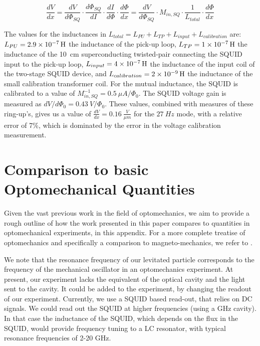 \begin{appendices}
\begin{equation}
    \frac{dV}{dx} = 
    \frac{dV}{d\Phi_{SQ}}\cdot\frac{d\Phi_{SQ}}{dI}\cdot\frac{dI}{d\Phi}\cdot\frac{d\Phi}{dx} =
    \frac{dV}{d\Phi_{SQ}} \cdot M_{in,SQ} \cdot \frac{1}{L_{total}}\cdot \frac{d\Phi}{dx}
\end{equation}

The values for the inductances in $L_{total} = L_{PU}+L_{TP}+L_{input}+L_{calibration}$ are: $L_{PU} = \SI{2.9e{-7}}{H}$ the inductance of the pick-up loop, $L_{TP} = \SI{1e{-7}}{H}$ the inductance of the \SI{10}{cm} superconducting twisted-pair connecting the SQUID input to the pick-up loop, $L_{input} = \SI{4e{-7}}{H}$ the inductance of the input coil of the two-stage SQUID device, and $L_{calibration} = \SI{2e{-9}}{H}$ the inductance of the small calibration transformer coil. For the mutual inductance, the SQUID is calibrated to a value of $M_{in,SQ}^{-1} = \SI{0.5}{\mu A/\Phi_0}$. The SQUID voltage gain is measured as $dV/d\Phi_0 = \SI{0.43}{V/\Phi_0}$. These values, combined with measures of these ring-up's, gives us a value of $\frac{dV}{dx} = \SI{0.16}{{\frac{V}{\mu m}}}$ for the $\SI{27}{Hz}$ mode, with a relative error of 7\%, which is dominated by the error in the voltage calibration measurement. 

\newpage

\section{Comparison to basic Optomechanical Quantities}
Given the vast previous work in the field of optomechanics, we aim to provide a rough outline of how the work presented in this paper compares to quantities in optomechanical experiments, in this appendix. For a more complete treatise of optomechanics and specifically a comparison to magneto-mechanics, we refer to \cite{Romero2021}.

We note that the resonance frequency of our levitated particle corresponds to the frequency of the mechanical oscillator in an optomechanics experiment. At present, our experiment lacks the equivalent of the optical cavity and the light sent to the cavity. It could be added to the experiment, by changing the readout of our experiment. Currently, we use a SQUID based read-out, that relies on DC signals. We could read out the SQUID at higher frequencies (using a GHz cavity). In that case the inductance of the SQUID, which depends on the flux in the SQUID, would provide frequency tuning to a LC resonator, with typical resonance frequencies of 2-20 GHz. 


\end{appendices}
